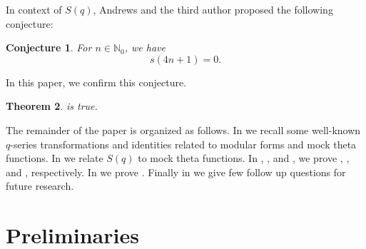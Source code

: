 \documentclass[12pt,reqno]{amsart}
\renewcommand{\(}{\left\(}
\renewcommand{\)}{\right\)}
\numberwithin{equation}{section}
\theoremstyle{plain}
\newtheorem{theorem}{Theorem}[section]
\newtheorem{conjecture}[theorem]{Conjecture}
\theoremstyle{definition}
\numberwithin{equation}{section}
\begin{document}
In context of $S(q)$, Andrews and the third author proposed \cite[Conjecture 3]{AB} the following conjecture: 
\begin{conjecture}\label{Conj2}
For $n\in \mathbb{N}_0$, we have 
\[s(4n+1)=0.\]
\end{conjecture}

In this paper, we confirm this conjecture.

\begin{theorem}\label{ABConj2}
	 is true.
\end{theorem}







The remainder of the paper is organized as follows. In  we recall some well-known $q$-series transformations and identities related to modular forms and mock theta functions. In  we relate $S(q)$ to mock theta functions. In , , and , we prove , , and , respectively. In  we prove . Finally in  we give few follow up questions for future research.



\section{Preliminaries}\label{sec1}
\end{document}
